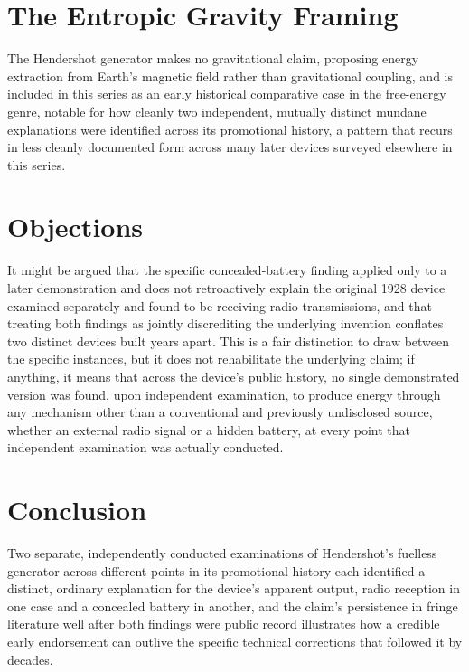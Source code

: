 \documentclass[11pt]{article}
\begin{document}
\section{The Entropic Gravity Framing}

The Hendershot generator makes no gravitational claim, proposing energy extraction from Earth's magnetic field rather than gravitational coupling, and is included in this series as an early historical comparative case in the free-energy genre, notable for how cleanly two independent, mutually distinct mundane explanations were identified across its promotional history, a pattern that recurs in less cleanly documented form across many later devices surveyed elsewhere in this series.

\section{Objections}

It might be argued that the specific concealed-battery finding applied only to a later demonstration and does not retroactively explain the original 1928 device examined separately and found to be receiving radio transmissions, and that treating both findings as jointly discrediting the underlying invention conflates two distinct devices built years apart. This is a fair distinction to draw between the specific instances, but it does not rehabilitate the underlying claim; if anything, it means that across the device's public history, no single demonstrated version was found, upon independent examination, to produce energy through any mechanism other than a conventional and previously undisclosed source, whether an external radio signal or a hidden battery, at every point that independent examination was actually conducted.

\section{Conclusion}

Two separate, independently conducted examinations of Hendershot's fuelless generator across different points in its promotional history each identified a distinct, ordinary explanation for the device's apparent output, radio reception in one case and a concealed battery in another, and the claim's persistence in fringe literature well after both findings were public record illustrates how a credible early endorsement can outlive the specific technical corrections that followed it by decades.
\end{document}
